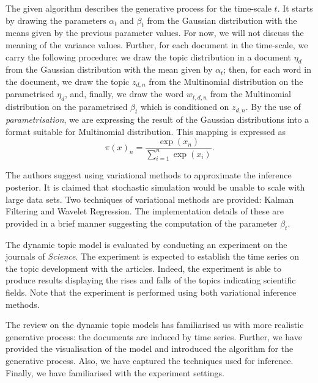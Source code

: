\documentclass{mprop}
\begin{document}
The given algorithm describes the generative process for the time-scale $t$. It starts by drawing the parameters $\alpha_t$ and $\beta_t$ from the Gaussian distribution with the means given by the previous parameter values. For now, we will not discuss the meaning of the variance values. Further, for each document in the time-scale, we carry the following procedure: we draw the topic distribution in a document $\eta_d$ from the Gaussian distribution with the mean given by $\alpha_t$; then, for each word in the document, we draw the topic $z_{d, n}$ from the Multinomial distribution on the parametrised $\eta_d$, and, finally, we draw the word $w_{t, d, n}$ from the Multinomial distribution on the parametrised $\beta_t$ which is conditioned on $z_{d, n}$. By the use of \textit{parametrisation}, we are expressing the result of the Gaussian distributions into a format suitable for Multinomial distribution. This mapping is expressed as
\begin{equation}
\pi(x)_n = \dfrac{\exp{(x_n)}}{\sum^n_{i=1}\exp{(x_i)}}.
\end{equation}

\par The authors suggest using variational methods to approximate the inference posterior. It is claimed that stochastic simulation would be unable to scale with large data sets. Two techniques of variational methods are provided: Kalman Filtering and Wavelet Regression. The implementation details of these are provided in a brief manner suggesting the computation of the parameter $\beta_t$. 

\par The dynamic topic model is evaluated by conducting an experiment on the journals of \textit{Science}. The experiment is expected to establish the time series on the topic development with the articles. Indeed, the experiment is able to produce results displaying the rises and falls of the topics indicating scientific fields. Note that the experiment is performed using both variational inference methods.   

\par The review on the dynamic topic models has familiarised us with more realistic generative process: the documents are induced by time series. Further, we have provided the visualisation of the model and introduced the algorithm for the generative process. Also, we have captured the techniques used for inference. Finally, we have familiarised with the experiment settings. 
\end{document}
